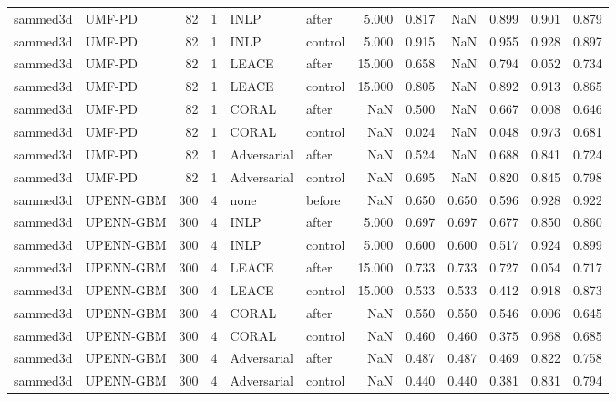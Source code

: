 \begin{tabular}{llrrllrrrrrr}
sammed3d & UMF-PD & 82 & 1 & INLP & after & 5.000 & 0.817 & NaN & 0.899 & 0.901 & 0.879 \\
sammed3d & UMF-PD & 82 & 1 & INLP & control & 5.000 & 0.915 & NaN & 0.955 & 0.928 & 0.897 \\
sammed3d & UMF-PD & 82 & 1 & LEACE & after & 15.000 & 0.658 & NaN & 0.794 & 0.052 & 0.734 \\
sammed3d & UMF-PD & 82 & 1 & LEACE & control & 15.000 & 0.805 & NaN & 0.892 & 0.913 & 0.865 \\
sammed3d & UMF-PD & 82 & 1 & CORAL & after & NaN & 0.500 & NaN & 0.667 & 0.008 & 0.646 \\
sammed3d & UMF-PD & 82 & 1 & CORAL & control & NaN & 0.024 & NaN & 0.048 & 0.973 & 0.681 \\
sammed3d & UMF-PD & 82 & 1 & Adversarial & after & NaN & 0.524 & NaN & 0.688 & 0.841 & 0.724 \\
sammed3d & UMF-PD & 82 & 1 & Adversarial & control & NaN & 0.695 & NaN & 0.820 & 0.845 & 0.798 \\
sammed3d & UPENN-GBM & 300 & 4 & none & before & NaN & 0.650 & 0.650 & 0.596 & 0.928 & 0.922 \\
sammed3d & UPENN-GBM & 300 & 4 & INLP & after & 5.000 & 0.697 & 0.697 & 0.677 & 0.850 & 0.860 \\
sammed3d & UPENN-GBM & 300 & 4 & INLP & control & 5.000 & 0.600 & 0.600 & 0.517 & 0.924 & 0.899 \\
sammed3d & UPENN-GBM & 300 & 4 & LEACE & after & 15.000 & 0.733 & 0.733 & 0.727 & 0.054 & 0.717 \\
sammed3d & UPENN-GBM & 300 & 4 & LEACE & control & 15.000 & 0.533 & 0.533 & 0.412 & 0.918 & 0.873 \\
sammed3d & UPENN-GBM & 300 & 4 & CORAL & after & NaN & 0.550 & 0.550 & 0.546 & 0.006 & 0.645 \\
sammed3d & UPENN-GBM & 300 & 4 & CORAL & control & NaN & 0.460 & 0.460 & 0.375 & 0.968 & 0.685 \\
sammed3d & UPENN-GBM & 300 & 4 & Adversarial & after & NaN & 0.487 & 0.487 & 0.469 & 0.822 & 0.758 \\
sammed3d & UPENN-GBM & 300 & 4 & Adversarial & control & NaN & 0.440 & 0.440 & 0.381 & 0.831 & 0.794 \\
\bottomrule
\end{tabular}
